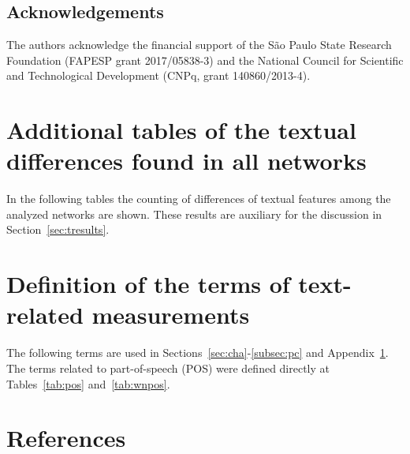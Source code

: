 \documentclass[review]{elsarticle}
\begin{document}
\subsection*{Acknowledgements}
The authors acknowledge the financial support of the São Paulo State Research Foundation (FAPESP grant 2017/05838-3) and the National Council for Scientific and Technological Development (CNPq, grant 140860/2013-4).

\appendix
\section{Additional tables of the textual differences found in all networks}\label{ap:textd}
In the following tables the counting of differences of textual features among the analyzed networks
are shown.
	These results are auxiliary for the discussion in Section~\ref{sec:tresults}.
\FloatBarrier











\section{Definition of the terms of text-related measurements}\label{ap:msTerms}
      The following terms are used in Sections~\ref{sec:cha}-\ref{subsec:pc} and Appendix~\ref{ap:textd}.
	The terms related to part-of-speech (POS) were defined directly at Tables~\ref{tab:pos} and~\ref{tab:wnpos}.


\section*{References}


\end{document}
